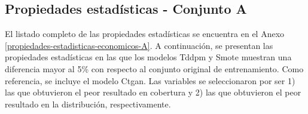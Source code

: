 \newpage
\subsection{Propiedades estadísticas - Conjunto A}
\label{propiedades-conjunto-a}
El listado completo de las propiedades estadísticas se encuentra en el Anexo \ref{propiedades-estadisticas-economicos-A}. A continuación, se presentan las propiedades estadísticas en las que los modelos Tddpm y Smote muestran una diferencia mayor al 5\% con respecto al conjunto original de entrenamiento. Como referencia, se incluye el modelo Ctgan. Las variables se seleccionaron por ser 1) las que obtuvieron el peor resultado en cobertura y 2) las que obtuvieron el peor resultado en la distribución, respectivamente.



\newpage
